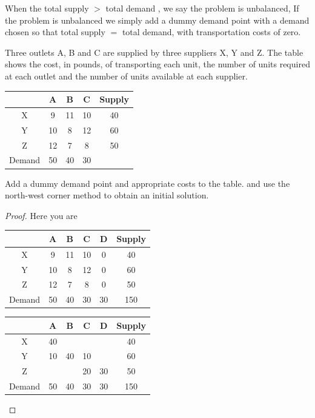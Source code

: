 \documentclass[a4paper]{article}
\begin{document}
\newpage
\begin{defi}[balanced]
	When the total supply $>$ total demand , we say the problem is unbalanced, If the problem is unbalanced we simply add a dummy demand point with a demand chosen so that total supply $=$ total demand, with transportation costs of zero.
\end{defi}
\begin{eg}
	Three outlets A, B and C are supplied by three suppliers X, Y and Z. The table shows the cost, in pounds, of transporting each unit, the number of units required at each outlet and the number of units available at each supplier.
	\begin{center}
		\begin{tabular}{|c|c|c|c|c|}
			\hline
			       & A  & B  & C  & Supply \\
			\hline
			X      & 9  & 11 & 10 & 40     \\
			\hline
			Y      & 10 & 8  & 12 & 60     \\
			\hline
			Z      & 12 & 7  & 8  & 50     \\
			\hline
			Demand & 50 & 40 & 30 &        \\
			\hline
		\end{tabular}
	\end{center}
	Add a dummy demand point and appropriate costs to the table.
	and use the north-west corner method to obtain an initial solution.

	\begin{proof}
		Here you are
		\begin{center}
			\begin{tabular}{|c|c|c|c|c|c|}
				\hline
				       & A  & B  & C  & D  & Supply \\
				\hline
				X      & 9  & 11 & 10 & 0  & 40     \\
				\hline
				Y      & 10 & 8  & 12 & 0  & 60     \\
				\hline
				Z      & 12 & 7  & 8  & 0  & 50     \\
				\hline
				Demand & 50 & 40 & 30 & 30 & 150    \\
				\hline
			\end{tabular}
		\end{center}

		\begin{center}
			\begin{tabular}{|c|c|c|c|c|c|}
				\hline
				       & A  & B  & C  & D  & Supply \\
				\hline
				X      & 40 &    &    &    & 40     \\
				\hline
				Y      & 10 & 40 & 10 &    & 60     \\
				\hline
				Z      &    &    & 20 & 30 & 50     \\
				\hline
				Demand & 50 & 40 & 30 & 30 & 150    \\
				\hline
			\end{tabular}
		\end{center}
	\end{proof}
\end{eg}
\end{document}

